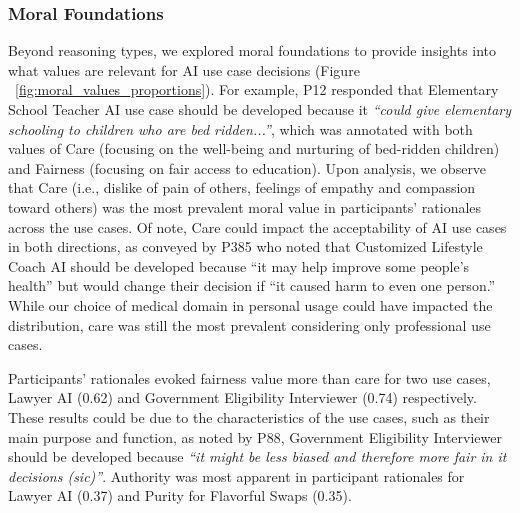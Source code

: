 

\subsubsection{Moral Foundations}
Beyond reasoning types, we explored moral foundations to provide insights into what values are relevant for AI use case decisions (Figure ~\ref{fig:moral_values_proportions}). For example, P12 responded that Elementary School Teacher AI use case should be developed because it \textit{``could give elementary schooling to children who are bed ridden...''}, which was annotated with both values of Care (focusing on the well-being and nurturing of bed-ridden children) and Fairness (focusing on fair access to education).
Upon analysis, we observe that Care (i.e., dislike of pain of others, feelings of empathy and compassion toward others) was the most prevalent moral value in participants' rationales across the use cases. Of note, Care could impact the acceptability of AI use cases in both directions, as conveyed by P385 who noted that Customized Lifestyle Coach AI should be developed because ``it may help improve some people's health'' but would change their decision if ``it caused harm to even one person.'' While our choice of medical domain in personal usage could have impacted the distribution, care was still the most prevalent considering only professional use cases. 

Participants' rationales evoked fairness value more than care for two use cases, Lawyer AI (0.62) and Government Eligibility Interviewer (0.74) respectively. These results could be due to the characteristics of the use cases, such as their main purpose and function, as noted by P88, Government Eligibility Interviewer should be developed because \textit{``it might be less biased and therefore more fair in it decisions (sic)''}. Authority was most apparent in participant rationales for Lawyer AI (0.37) and Purity for Flavorful Swaps (0.35). 

